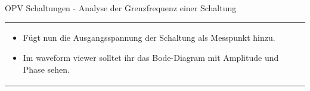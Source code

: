 \begin{frame}[t]{OPV Schaltungen - Analyse der Grenzfrequenz einer Schaltung }
\begin{spacing}{0.9}
\begin{tiny}
\begin{table}[h!]
\begin{tabular}{p{6cm} p{4cm}}
\begin{minipage}{.4\textwidth}
\begin{itemize}
              \item Fügt nun die Ausgangsspannung der Schaltung als Messpunkt hinzu.
              \item Im waveform viewer solltet ihr das Bode-Diagram mit Amplitude und Phase sehen.
            \end{itemize}
            \end{minipage} 
            \\
          \end{tabular}

        \end{table}
        
        \end{tiny} \end{spacing}

                    
        
         \end{frame}


